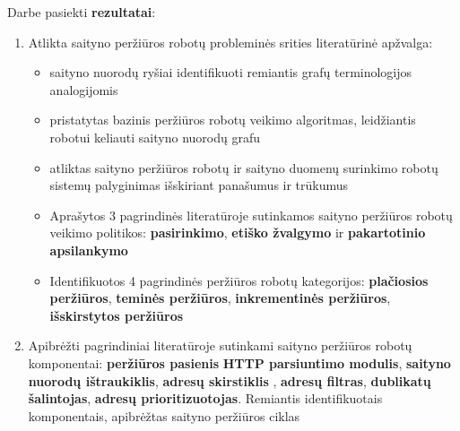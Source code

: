 
Darbe pasiekti \textbf{rezultatai}: 

\begin{enumerate}
    \item Atlikta saityno peržiūros robotų probleminės srities literatūrinė apžvalga: 
    \begin{itemize}
        \item  saityno nuorodų ryšiai identifikuoti remiantis grafų terminologijos analogijomis
        \item pristatytas bazinis peržiūros robotų veikimo algoritmas, leidžiantis robotui keliauti saityno nuorodų grafu
        \item atliktas saityno peržiūros robotų ir saityno duomenų surinkimo robotų sistemų palyginimas išskiriant panašumus ir trūkumus
        \item Aprašytos 3 pagrindinės literatūroje sutinkamos saityno peržiūros robotų veikimo politikos: \textbf{pasirinkimo}, \textbf{etiško žvalgymo} ir \textbf{pakartotinio apsilankymo}
        \item Identifikuotos 4 pagrindinės peržiūros robotų kategorijos: \textbf{plačiosios peržiūros}, \textbf{teminės peržiūros}, \textbf{inkrementinės peržiūros}, \textbf{išskirstytos peržiūros}
    \end{itemize}
    \item Apibrėžti pagrindiniai literatūroje sutinkami saityno peržiūros robotų komponentai: \textbf{peržiūros pasienis} \textbf{HTTP parsiuntimo modulis}, \textbf{saityno nuorodų ištraukiklis}, \textbf{adresų skirstiklis} , \textbf{adresų filtras}, \textbf{dublikatų šalintojas}, \textbf{adresų prioritizuotojas}. Remiantis identifikuotais komponentais, apibrėžtas saityno peržiūros ciklas
\end{enumerate}